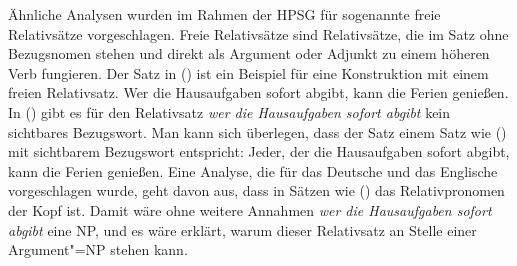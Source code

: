 Ähnliche Analysen wurden im Rahmen der HPSG für sogenannte freie Relativsätze
vorgeschlagen. Freie Relativsätze sind Relativsätze, die im Satz ohne Bezugsnomen
stehen und direkt als Argument oder Adjunkt zu einem höheren Verb fungieren.
Der Satz in () ist ein Beispiel für eine Konstruktion mit einem freien Relativsatz.
\ea
Wer die Hausaufgaben sofort abgibt, kann die Ferien genießen.
\z
In () gibt es für den Relativsatz \emph{wer die Hausaufgaben sofort abgibt} kein
sichtbares Bezugswort. Man kann sich überlegen, dass der Satz einem Satz wie ()
mit sichtbarem Bezugswort entspricht:
\ea
Jeder, der die Hausaufgaben sofort abgibt, kann die Ferien genießen.
\z
Eine Analyse, die für das Deutsche \citep{Kubota2003a-u} und das Englische \citep{WK03a}
vorgeschlagen wurde, geht davon aus, dass in Sätzen wie () das Relativpronomen der Kopf ist.
Damit wäre ohne weitere Annahmen \emph{wer die Hausaufgaben sofort abgibt} eine NP,
und es wäre erklärt, warum dieser Relativsatz an Stelle einer Argument"=NP stehen kann.

